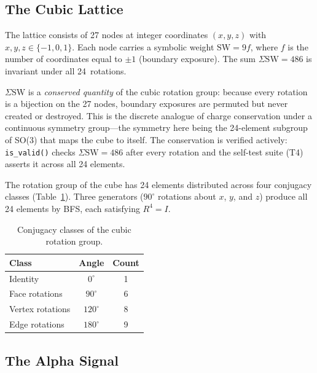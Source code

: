 \documentclass{article}
\begin{document}
\subsection{The Cubic Lattice}

The lattice consists of 27 nodes at integer coordinates $(x,y,z)$ with $x,y,z\in\{-1,0,1\}$.  Each node carries a symbolic weight $\mathrm{SW}=9f$, where $f$ is the number of coordinates equal to $\pm 1$ (boundary exposure).  The sum $\Sigma\mathrm{SW}=486$ is invariant under all 24~rotations.

$\Sigma\mathrm{SW}$ is a \emph{conserved quantity} of the cubic rotation group: because every rotation is a bijection on the 27 nodes, boundary exposures are permuted but never created or destroyed.  This is the discrete analogue of charge conservation under a continuous symmetry group---the symmetry here being the 24-element subgroup of SO(3) that maps the cube to itself.  The conservation is verified actively: \texttt{is\_valid()} checks $\Sigma\mathrm{SW}=486$ after every rotation and the self-test suite (T4) asserts it across all 24 elements.

The rotation group of the cube has 24 elements distributed across four conjugacy classes (Table~\ref{tab:conjugacy}).  Three generators ($90^{\circ}$ rotations about $x$, $y$, and $z$) produce all 24 elements by BFS, each satisfying $R^{4}=I$.

\begin{table}[h]
  \caption{Conjugacy classes of the cubic rotation group.}
  \label{tab:conjugacy}
  \centering
  \begin{tabular}{lcc}
    \toprule
    Class & Angle & Count \\
    \midrule
    Identity        & $0^{\circ}$   & 1 \\
    Face rotations  & $90^{\circ}$  & 6 \\
    Vertex rotations& $120^{\circ}$ & 8 \\
    Edge rotations  & $180^{\circ}$ & 9 \\
    \bottomrule
  \end{tabular}
\end{table}

\subsection{The Alpha Signal}
\label{sec:alpha}
\end{document}
